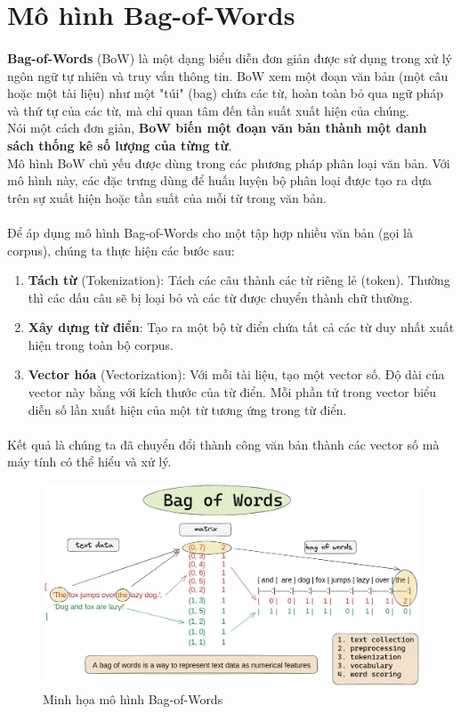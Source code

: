 \newpage
\section{Mô hình Bag-of-Words} \label{bow-section}

\paragraph{}{\textbf{Bag-of-Words} (BoW) \cite{qader2019overview} là một dạng biểu diễn đơn giản được sử dụng trong xử lý ngôn ngữ tự nhiên và truy vấn thông tin. 
BoW xem một đoạn văn bản (một câu hoặc một tài liệu) như một "túi" (bag) chứa các từ, hoàn toàn bỏ qua ngữ pháp và thứ tự của các từ, mà chỉ quan tâm đến tần suất xuất hiện của chúng. \\

Nói một cách đơn giản, \textbf{BoW biến một đoạn văn bản thành một danh sách thống kê số lượng của từng từ}. \\

Mô hình BoW chủ yếu được dùng trong các phương pháp phân loại văn bản. Với mô hình này, các đặc trưng dùng để huấn luyện bộ phân loại được tạo ra dựa trên sự xuất hiện hoặc tần suất của mỗi từ trong văn bản.
}

\paragraph{}{Để áp dụng mô hình Bag-of-Words cho một tập hợp nhiều văn bản (gọi là corpus), chúng ta thực hiện các bước sau:}

\begin{enumerate}
    \item \textbf{Tách từ} (Tokenization): Tách các câu thành các từ riêng lẻ (token). Thường thì các dấu câu sẽ bị loại bỏ và các từ được chuyển thành chữ thường.
    \item \textbf{Xây dựng từ điển}: Tạo ra một bộ từ điển chứa tất cả các từ duy nhất xuất hiện trong toàn bộ corpus.
    \item \textbf{Vector hóa} (Vectorization): Với mỗi tài liệu, tạo một vector số. Độ dài của vector này bằng với kích thước của từ điển. Mỗi phần tử trong vector biểu diễn số lần xuất hiện của một từ tương ứng trong từ điển.
\end{enumerate}

\paragraph{}{Kết quả là chúng ta đã chuyển đổi thành công văn bản thành các vector số mà máy tính có thể hiểu và xử lý.}

\begin{figure}[H]
    \centering
    \includegraphics[width=0.84\linewidth]{img/04-bow.jpg}
    \caption{Minh họa mô hình Bag-of-Words}
\end{figure}